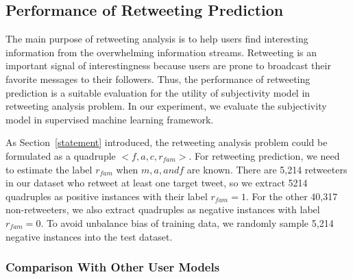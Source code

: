 \documentclass[twocolumn]{svjour3}          %
\begin{document}
\subsection{Performance of Retweeting Prediction}
\label{performance}

The main purpose of retweeting analysis is to help users find interesting information from the overwhelming information streams. 
Retweeting is an important signal of interestingness because users are prone to broadcast their favorite messages to their followers. 
Thus, the performance of retweeting prediction is a suitable evaluation for the utility of subjectivity model in retweeting analysis problem. 
In our experiment, we evaluate the subjectivity model in supervised machine learning framework.

As Section~\ref{statement} introduced, the retweeting analysis problem could be formulated as a quadruple $< f, a, c, r_{fam} > $. 
For retweeting prediction, we need to estimate the label $ r_{fam} $ when $ m, a, and  f $ are known. 
There are 5,214 retweeters in our dataset who retweet at least one target tweet, so we extract 5214 quadruples as positive instances with their label $ r_{fam}=1 $. 
For the other 40,317 non-retweeters, we also extract quadruples as negative instances with label $ r_{fam}=0 $. 
To avoid unbalance bias of training data, we randomly sample 5,214 negative instances into the test dataset. 

\subsubsection{Comparison With Other User Models}
\label{comparison}
\end{document}
